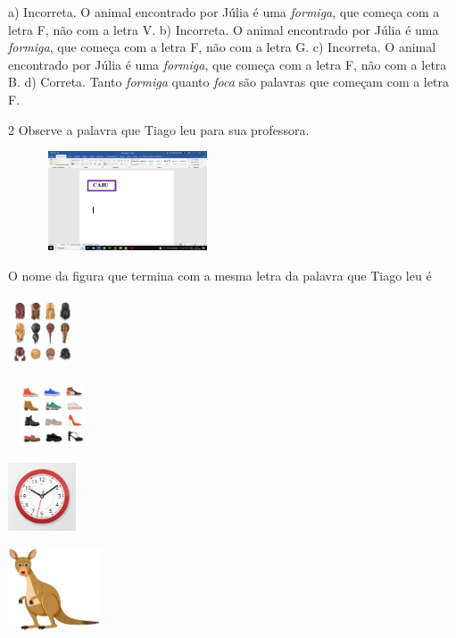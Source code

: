 a) Incorreta. O animal encontrado por Júlia é uma \textit{formiga}, 
que começa com a letra F, não com a letra V.
b) Incorreta. O animal encontrado por Júlia é uma \textit{formiga}, 
que começa com a letra F, não com a letra G.
c) Incorreta. O animal encontrado por Júlia é uma \textit{formiga}, 
que começa com a letra F, não com a letra B. 
d) Correta. Tanto \textit{formiga} quanto \textit{foca} são palavras
que começam com a letra F.

\num{2} Observe a palavra que Tiago leu para sua professora.

\includegraphics[width=2.79792in,height=1.15833in]{media/image43.png}

O nome da figura que termina com a mesma letra da palavra que Tiago leu é

\begin{escolha}
\item\includegraphics[width=0.79792in,height=0.81667in]{media/image44.jpeg}

\item\includegraphics[width=1.02847in,height=0.72292in]{media/image45.jpeg}

\item\includegraphics[width=0.79792in,height=0.79931in]{media/image46.jpeg}

\item\includegraphics[width=1.08611in,height=0.97222in]{media/image47.jpeg}
\end{escolha}

